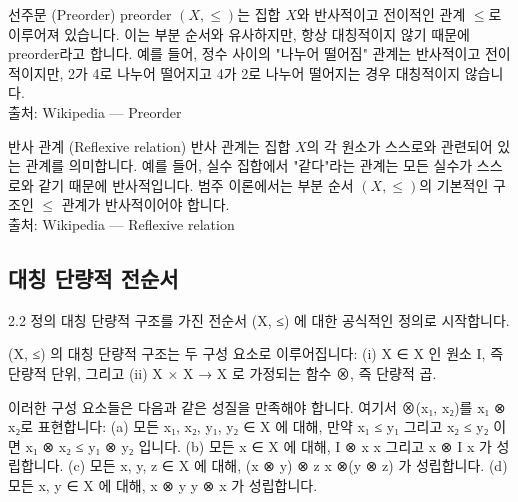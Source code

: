 \documentclass[11pt, a4paper, twoside, openany]{book}
\begin{document}
\begin{deepresearch}{선주문 (Preorder)}
preorder $(X, \le)$는 집합 $X$와 반사적이고 전이적인 관계 $\le$로 이루어져 있습니다.  이는 부분 순서와 유사하지만, 항상 대칭적이지 않기 때문에 preorder\hspace{0pt}라고 합니다. 예를 들어, 정수 사이의 "나누어 떨어짐" 관계는 반사적이고 전이적이지만, 2\hspace{0pt}가 4\hspace{0pt}로 나누어 떨어지고 4\hspace{0pt}가 2\hspace{0pt}로 나누어 떨어지는 경우 대칭적이지 않습니다.
\\[4pt]{\footnotesize\color{ctgray} 출처: Wikipedia — Preorder}
\end{deepresearch}

\begin{deepresearch}{반사 관계 (Reflexive relation)}
반사 관계는 집합 $X$의 각 원소가 스스로와 관련되어 있는 관계를 의미합니다. 예를 들어, 실수 집합에서 "같다"라는 관계는 모든 실수가 스스로와 같기 때문에 반사적입니다.  범주 이론에서는 부분 순서 $(X, \le)$의 기본적인 구조인 $\le$ 관계가 반사적이어야 합니다.
\\[4pt]{\footnotesize\color{ctgray} 출처: Wikipedia — Reflexive relation}
\end{deepresearch}


\subsection{대칭 단량적 전순서}
\label{sec:2-2-1}

2.2 정의  대칭 단량적 구조를 가진 전순서 (X, ≤) 에 대한 공식적인 정의로 시작합니다. 

\par{} 
\begin{definitionbox}[정의.]
(X, ≤) 의 대칭 단량적 구조는 두 구성 요소로 이루어집니다:
(i) X ∈ X 인 원소 I, 즉 단량적 단위, 그리고
(ii) X × X → X 로 가정되는 함수 ⊗, 즉 단량적 곱.
\end{definitionbox}

\par\medskip
이러한 구성 요소들은 다음과 같은 성질을 만족해야 합니다. 여기서 ⊗(x₁, x₂)를 x₁ ⊗ x₂로 표현합니다:
(a) 모든 x₁, x₂, y₁, y₂ ∈ X 에 대해, 만약 x₁ ≤ y₁ 그리고 x₂ ≤ y₂ 이면 x₁ ⊗ x₂ ≤ y₁ ⊗ y₂ 입니다.
(b) 모든 x ∈ X 에 대해, I ⊗ x  x 그리고 x ⊗ I  x 가 성립합니다.
(c) 모든 x, y, z ∈ X 에 대해, (x ⊗ y) ⊗ z  x ⊗(y ⊗ z) 가 성립합니다.
(d) 모든 x, y ∈ X 에 대해, x ⊗ y  y ⊗ x 가 성립합니다.
\end{document}
